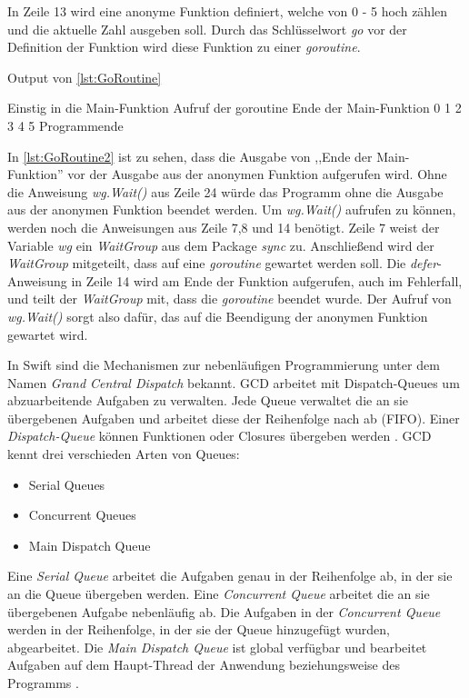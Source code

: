 In Zeile 13 wird eine anonyme Funktion definiert, welche von 0 - 5 hoch zählen und die aktuelle Zahl ausgeben soll.
Durch das Schlüsselwort \textit{go} vor der Definition der Funktion wird diese Funktion zu einer \textit{goroutine}. 

\begin{listing}
\caption{Output von \autoref{lst:GoRoutine}}
\label{lst:GoRoutine2}
\begin{Commandline}
Einstig in die Main-Funktion
Aufruf der goroutine
Ende der Main-Funktion
0 1 2 3 4 5
Programmende
\end{Commandline}
\end{listing}

In \autoref{lst:GoRoutine2} ist zu sehen, dass die Ausgabe von ,,Ende der Main-Funktion'' vor der Ausgabe aus der anonymen Funktion aufgerufen wird.
Ohne die Anweisung \textit{wg.Wait()} aus Zeile 24 würde das Programm ohne die Ausgabe aus der anonymen Funktion beendet werden.
Um \textit{wg.Wait()} aufrufen zu können, werden noch die Anweisungen aus Zeile 7,8 und 14 benötigt.
Zeile 7 weist der Variable \textit{wg} ein \textit{WaitGroup} aus dem Package \textit{sync} zu.
Anschließend wird der \textit{WaitGroup} mitgeteilt, dass auf eine \textit{goroutine} gewartet werden soll. 
Die \textit{defer}-Anweisung in Zeile 14 wird am Ende der Funktion aufgerufen, auch im Fehlerfall, und teilt der \textit{WaitGroup} mit, dass die \textit{goroutine} beendet wurde.
Der Aufruf von \textit{wg.Wait()} sorgt also dafür, das auf die Beendigung der anonymen Funktion gewartet wird.

In Swift sind die Mechanismen zur nebenläufigen Programmierung unter dem Namen \textit{Grand Central Dispatch}  bekannt.
GCD arbeitet mit Dispatch-Queues um abzuarbeitende Aufgaben zu verwalten.
Jede Queue verwaltet die an sie übergebenen Aufgaben und arbeitet diese der Reihenfolge nach ab (FIFO). 
Einer \textit{Dispatch-Queue} können Funktionen oder Closures übergeben werden \cite[S.254]{Hoffman.2017}.
GCD kennt drei verschieden Arten von Queues:

\begin{itemize}
    \item Serial Queues
    \item Concurrent Queues
    \item Main Dispatch Queue
\end{itemize}

Eine \textit{Serial Queue} arbeitet die Aufgaben genau in der Reihenfolge ab, in der sie an die Queue übergeben werden.
Eine \textit{Concurrent Queue} arbeitet die an sie übergebenen Aufgabe nebenläufig ab. 
Die Aufgaben in der \textit{Concurrent Queue} werden in der Reihenfolge, in der sie der Queue hinzugefügt wurden, abgearbeitet.
Die \textit{Main Dispatch Queue} ist global verfügbar und bearbeitet Aufgaben auf dem Haupt-Thread der Anwendung beziehungsweise des Programms \cite[S.255]{Hoffman.2017}.

